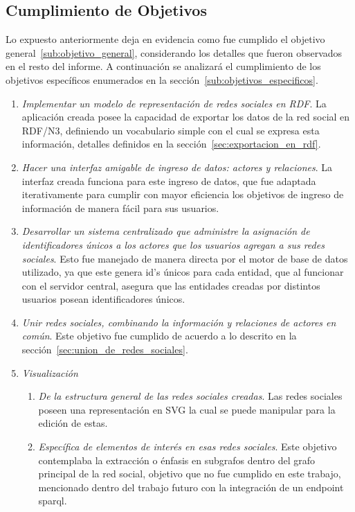 \subsection{Cumplimiento de Objetivos} %
\label{sub:cumplimiento_de_objetivos}

Lo expuesto anteriormente deja en evidencia como fue cumplido el objetivo general~\ref{sub:objetivo_general}, considerando los detalles que fueron observados en el resto del informe. A continuación se analizará el cumplimiento de los objetivos específicos enumerados en la sección~\ref{sub:objetivos_especificos}.

\begin{enumerate}
  \item \emph{Implementar un modelo de representación de redes sociales en RDF}. La aplicación creada posee la capacidad de exportar los datos de la red social en RDF/N3, definiendo un vocabulario simple con el cual se expresa esta información, detalles definidos en la sección~\ref{sec:exportacion_en_rdf}.
  
  \item \emph{Hacer una interfaz amigable de ingreso de datos: actores y relaciones}. La interfaz creada funciona para este ingreso de datos, que fue adaptada iterativamente para cumplir con mayor eficiencia los objetivos de ingreso de información de manera fácil para sus usuarios.
  
  \item \emph{Desarrollar un sistema centralizado que administre la asignación de identificadores únicos a los actores que los usuarios agregan a sus redes sociales}. Esto fue manejado de manera directa por el motor de base de datos utilizado, ya que este genera id's únicos para cada entidad, que al funcionar con el servidor central, asegura que las entidades creadas por distintos usuarios posean identificadores únicos.
  
  \item \emph{Unir redes sociales, combinando la información y relaciones de actores en común}. Este objetivo fue cumplido de acuerdo a lo descrito en la sección~\ref{sec:union_de_redes_sociales}.
  
  \item \emph{Visualización}
    \begin{enumerate}
      \item \emph{De la estructura general de las redes sociales creadas}. Las redes sociales poseen una representación en SVG la cual se puede manipular para la edición de estas.
      \item \emph{Específica de elementos de interés en esas redes sociales}. Este objetivo contemplaba la extracción o énfasis en subgrafos dentro del grafo principal de la red social, objetivo que no fue cumplido en este trabajo, mencionado dentro del trabajo futuro con la integración de un endpoint sparql.
    \end{enumerate}
    

\end{enumerate}
